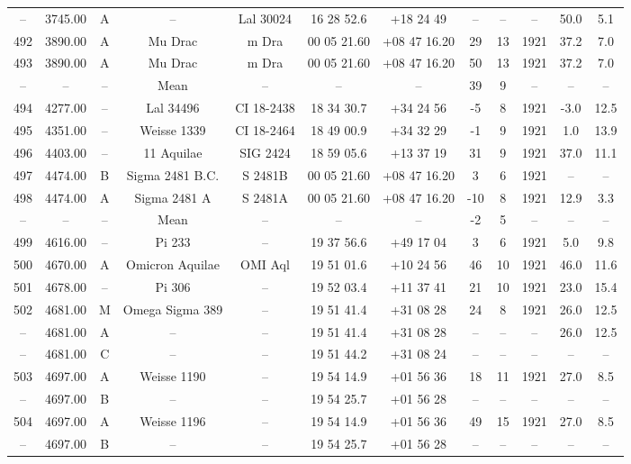 \begin{table}
\begin{tabular}{cccccccccccc}
-- & 3745.00 & A & -- & Lal 30024 & 16 28 52.6 & +18 24 49 & -- & -- & -- & 50.0 & 5.1 \\
492 & 3890.00 & A & Mu Drac & m Dra & 00 05 21.60 & +08 47 16.20 & 29 & 13 & 1921 & 37.2 & 7.0 \\
493 & 3890.00 & A & Mu Drac & m Dra & 00 05 21.60 & +08 47 16.20 & 50 & 13 & 1921 & 37.2 & 7.0 \\
-- & -- & -- & Mean & -- & -- & -- & 39 & 9 & -- & -- & -- \\
494 & 4277.00 & -- & Lal 34496 & CI 18-2438 & 18 34 30.7 & +34 24 56 & -5 & 8 & 1921 & -3.0 & 12.5 \\
495 & 4351.00 & -- & Weisse 1339 & CI 18-2464 & 18 49 00.9 & +34 32 29 & -1 & 9 & 1921 & 1.0 & 13.9 \\
496 & 4403.00 & -- & 11 Aquilae & SIG 2424 & 18 59 05.6 & +13 37 19 & 31 & 9 & 1921 & 37.0 & 11.1 \\
497 & 4474.00 & B & Sigma 2481 B.C. & S 2481B & 00 05 21.60 & +08 47 16.20 & 3 & 6 & 1921 & -- & -- \\
498 & 4474.00 & A & Sigma 2481 A & S 2481A & 00 05 21.60 & +08 47 16.20 & -10 & 8 & 1921 & 12.9 & 3.3 \\
-- & -- & -- & Mean & -- & -- & -- & -2 & 5 & -- & -- & -- \\
499 & 4616.00 & -- & Pi 233 & -- & 19 37 56.6 & +49 17 04 & 3 & 6 & 1921 & 5.0 & 9.8 \\
500 & 4670.00 & A & Omicron Aquilae & OMI Aql & 19 51 01.6 & +10 24 56 & 46 & 10 & 1921 & 46.0 & 11.6 \\
501 & 4678.00 & -- & Pi 306 & -- & 19 52 03.4 & +11 37 41 & 21 & 10 & 1921 & 23.0 & 15.4 \\
502 & 4681.00 & M & Omega Sigma 389 & -- & 19 51 41.4 & +31 08 28 & 24 & 8 & 1921 & 26.0 & 12.5 \\
-- & 4681.00 & A & -- & -- & 19 51 41.4 & +31 08 28 & -- & -- & -- & 26.0 & 12.5 \\
-- & 4681.00 & C & -- & -- & 19 51 44.2 & +31 08 24 & -- & -- & -- & -- & -- \\
503 & 4697.00 & A & Weisse 1190 & -- & 19 54 14.9 & +01 56 36 & 18 & 11 & 1921 & 27.0 & 8.5 \\
-- & 4697.00 & B & -- & -- & 19 54 25.7 & +01 56 28 & -- & -- & -- & -- & -- \\
504 & 4697.00 & A & Weisse 1196 & -- & 19 54 14.9 & +01 56 36 & 49 & 15 & 1921 & 27.0 & 8.5 \\
-- & 4697.00 & B & -- & -- & 19 54 25.7 & +01 56 28 & -- & -- & -- & -- & -- \\

\end{tabular}
\end{table}
